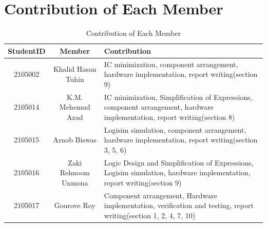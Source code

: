 \documentclass[11pt]{article}
\begin{document}
\section{Contribution of Each Member}
\begin{table}[ht]
    \centering
    \begin{tabular}{|c|c|p{8cm}|}
        \hline
        \textbf{StudentID} & \textbf{Member} & \textbf{Contribution} \\
        \hline
        2105002 & Khalid Hasan Tuhin & IC minimization, component arrangement, hardware implementation, report writing(section 9) \\
        \hline
        2105014 & K.M. Mehemud Azad & IC minimization, Simplification of Expressions, component arrangement, hardware implementation, report writing(section 8) \\
        \hline
        2105015 & Arnob Biswas & Logisim simulation, component arrangement, hardware implementation, report writing(section 3, 5, 6) \\
        \hline
        2105016 & Zaki Rehnoom Unmona & Logic Design and Simplification of Expressions, Logisim simulation, hardware implementation, report writing(section 9) \\
        \hline
        2105017 & Gourove Roy & Component arrangement, Hardware implementation, verification and testing, report writing(section 1, 2, 4, 7, 10) \\
        \hline
    \end{tabular}
    \caption{Contribution of Each Member}
\end{table}
\end{document}
